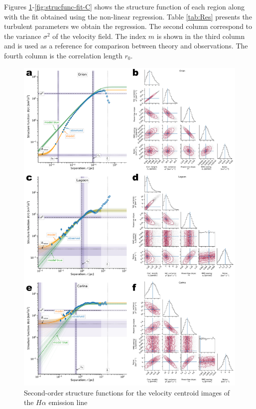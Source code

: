 \documentclass[fleqn,usenatbib, useAMS, a4paper]{mnras}
\begin{document}
Figures \ref{fig:strucfunc-fit-A}-\ref{fig:strucfunc-fit-C} shows the structure function of each region along with the fit obtained using the non-linear regression.
Table \ref{tab:Res} presents the turbulent parameters we obtain the regression.
The second column correspond to the variance \(\sigma^2\) of the velocity field.
The index \(m\) is shown in the third column and is used as a reference for comparison between theory and observations.
The fourth column is the correlation length \(r_0\).

\begin{figure}
  \centering
  \includegraphics[width=0.8\linewidth]{Figures/strucfunc-fit-A}
  \caption{Second-order structure functions for the velocity centroid images of the \(H\alpha\) emission line}\label{fig:strucfunc-fit-A}
\end{figure}
\end{document}

